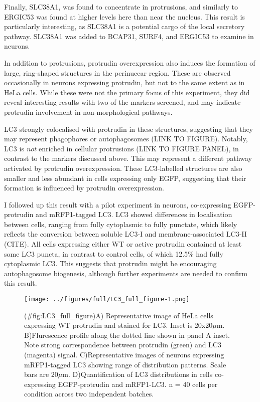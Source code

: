 \documentclass[
  12pt,
  a4paper,
]{book}
\begin{document}
Finally, SLC38A1, was found to concentrate in protrusions, and similarly to ERGIC53 was found at higher levels here than near the nucleus. This result is particularly interesting, as SLC38A1 is a potential cargo of the local secretory pathway. SLC38A1 was added to BCAP31, SURF4, and ERGIC53 to examine in neurons.

In addition to protrusions, protrudin overexpression also induces the formation of large, ring-shaped structures in the perinucear region. These are observed occasionally in neurons expressing protrudin, but not to the same extent as in HeLa cells. While these were not the primary focus of this experiment, they did reveal interesting results with two of the markers screened, and may indicate protrudin involvement in non-morphological pathways.

LC3 strongly colocalised with protrudin in these structures, suggesting that they may represent phagophores or autophagosomes (LINK TO FIGURE). Notably, LC3 is \emph{not} enriched in cellular protrusions (LINK TO FIGURE PANEL), in contrast to the markers discussed above. This may represent a different pathway activated by protrudin overexpression. These LC3-labelled structures are also smaller and less abundant in cells expressing only EGFP, suggesting that their formation is influenced by protrudin overexpression.

I followed up this result with a pilot experiment in neurons, co-expressing EGFP-protrudin and mRFP1-tagged LC3. LC3 showed differences in localisation between cells, ranging from fully cytoplasmic to fully punctate, which likely reflects the conversion between soluble LC3-I and membrane-associated LC3-II (CITE). All cells expressing either WT or active protrudin contained at least some LC3 puncta, in contrast to control cells, of which 12.5\% had fully cytoplasmic LC3. This suggests that protrudin might be encouraging autophagosome biogenesis, although further experiments are needed to confirm this result.

\begin{figure}
\centering
\texttt{[image: ../figures/full/LC3\_full\_figure-1.png]}
\caption{(\#fig:LC3\_full\_figure)A) Representative image of HeLa cells expressing WT protrudin and stained for LC3. Inset is 20x20\(\mu\)m. B)Flurescence profile along the dotted line shown in panel A inset. Note strong correspondence between protrudin (green) and LC3 (magenta) signal. C)Representative images of neurons expressing mRFP1-tagged LC3 showing range of distribution patterns. Scale bars are 20\(\mu\)m. D)Quantification of LC3 distributions in cells co-expressing EGFP-protrudin and mRFP1-LC3. n = 40 cells per condition across two independent batches.}
\end{figure}
\end{document}
